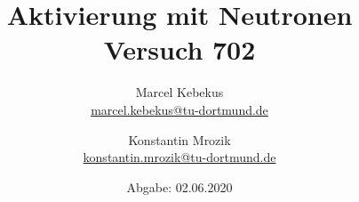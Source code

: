 

\title{Aktivierung mit Neutronen\\
\small{Versuch 702}
}
\author{%
  Marcel Kebekus\\%
  \href{mailto:marcel.kebekus@tu-dortmund.de}{marcel.kebekus@tu-dortmund.de} \and
  Konstantin Mrozik\\
  \href{mailto:konstantin.mrozik@tu-dortmund.de}{konstantin.mrozik@tu-dortmund.de}%
}
\date{%
  Abgabe: 02.06.2020 
}
\publishers{TU Dortmund – Fakultät Physik}
\makeatletter         
\def\@maketitle{
\raggedright
\texttt{[image: bilder/lo\_TU-Do 2008/logo\_rgb\_jpg]}\\[8ex]
\begin{center}
{\Huge \bfseries \sffamily \@title }\\[4ex] 
{\Large  \@author}\\[4ex] 
\@date\\[8ex]
\publishers\\
\end{center}}
\makeatother





\maketitle
\thispagestyle{empty}
\tableofcontents
\newpage




\newpage
\nocite{*}
\printbibliography





